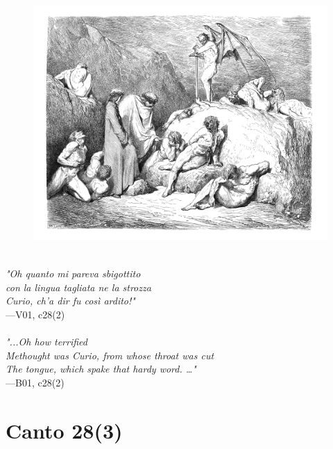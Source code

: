 \documentclass[../Dore_vision.tex]{subfiles}
\begin{document}
\begin{figure}[ht]
\centering
\includegraphics[height=\figsize]{illustrations/book_1/V01, c28(2).jpg}
\end{figure}

\begin{center}
\begin{minipage}{0.8\linewidth}
\textit{\\
"Oh quanto mi pareva sbigottito\\con la lingua tagliata ne la strozza\\Curio, ch’a dir fu così ardito!"} \\
—V01, c28(2) \\~\\
\textit{"...Oh how terrified\\Methought was Curio, from whose throat was cut\\The tongue, which spake that hardy word. …"} \\
—B01, c28(2)
\end{minipage}
\end{center}

\newpage

\section{Canto 28(3)}
\end{document}
